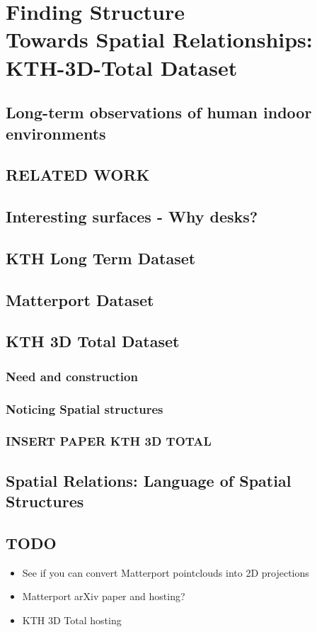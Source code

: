 \chapter[]{Finding Structure \\ {\Large Towards Spatial Relationships: KTH-3D-Total Dataset}}
\label{chap:FindingStructures}

\section{Long-term observations of human indoor environments}
\section{RELATED WORK}
\section{Interesting surfaces - Why desks?}
\section{KTH Long Term Dataset}
\section{Matterport Dataset}
\section{KTH 3D Total Dataset}
\subsection{Need and construction}
\subsection{Noticing Spatial structures}
\subsection{INSERT PAPER KTH 3D TOTAL}
\section{Spatial Relations: Language of Spatial Structures}
\section{TODO}
\begin{itemize}
\item See if you can convert Matterport pointclouds into 2D projections
\item Matterport arXiv paper and hosting?
\item KTH 3D Total hosting
\end{itemize}

